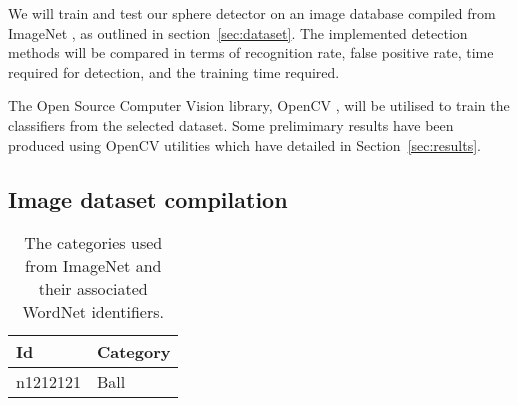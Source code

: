 \documentclass[11pt]{scrartcl}
\begin{document}
{		We will train and test our sphere detector on an image
        database compiled from ImageNet \citep{imagenet_cvpr09}, as outlined in 
        section~\ref{sec:dataset}. The implemented detection methods will be 
        compared in terms of recognition rate, false positive rate, time 
        required for detection, and the training time required.

        The Open Source Computer Vision library, OpenCV \citep{opencv_library},
        will be utilised to train the classifiers from the selected dataset. 
        Some prelimimary results have been produced using OpenCV utilities 
        which have detailed in Section~\ref{sec:results}.

        \subsection{Image dataset compilation} {
        \label{sec:dataset}

            \begin{table}
            \centering
            \caption{The categories used from ImageNet and their associated WordNet \citep{fellbaum1998wordnet} identifiers.}
            \begin{tabular}{ll}
                \toprule
                \textbf{Id} & \textbf{Category} \\
                \midrule
                n1212121 & Ball \\
                \bottomrule
            \end{tabular}
            \end{table}




}}
\end{document}
